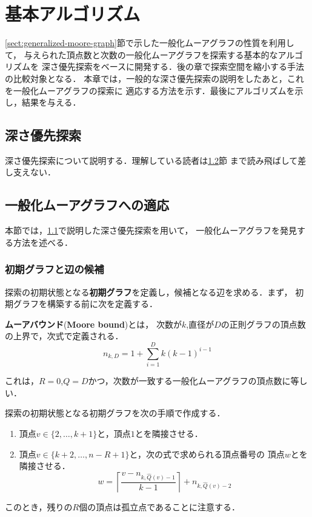
\chapter{基本アルゴリズム}
\label{chap:basic-algorithm}
\ref{sect:generalized-moore-graph}節で示した一般化ムーアグラフの性質を利用して，
与えられた頂点数と次数の一般化ムーアグラフを探索する基本的なアルゴリズムを
深さ優先探索をベースに開発する．後の章で探索空間を縮小する手法の比較対象となる．
本章では，一般的な深さ優先探索の説明をしたあと，これを一般化ムーアグラフの探索に
適応する方法を示す．最後にアルゴリズムを示し，結果を与える．

\section{深さ優先探索}
\label{sect:depth-first-search}
深さ優先探索について説明する．理解している読者は\ref{sect:apply-to-gmg}節
まで読み飛ばして差し支えない．

\section{一般化ムーアグラフへの適応}
\label{sect:apply-to-gmg}
本節では，\ref{sect:depth-first-search}で説明した深さ優先探索を用いて，
一般化ムーアグラフを発見する方法を述べる．

\subsection{初期グラフと辺の候補}
\label{subsect:initial-graph}
探索の初期状態となる\textbf{初期グラフ}を定義し，候補となる辺を求める．まず，
初期グラフを構築する前に次を定義する．
\begin{definition}
  \textbf{ムーアバウンド}(\textbf{Moore bound})とは，
  次数が$k$,直径が$D$の正則グラフの頂点数の上界で，次式で定義される．
  \begin{equation}
    n_{k,D} = 1 + \sum_{i=1}^Dk(k-1)^{i-1}
  \end{equation}
\end{definition}
これは，$R=0$,$Q=D$かつ，次数が一致する一般化ムーアグラフの頂点数に等しい．

探索の初期状態となる初期グラフを次の手順で作成する．
\begin{enumerate}
\item 頂点$v\in\{2,\ldots,k+1\}$と，頂点$1$とを隣接させる．
\item 頂点$v\in\{k+2,\ldots,n-R+1\}$と，次の式で求められる頂点番号の
  頂点$w$とを隣接させる．
  \[ w=\left\lceil\frac{v-n_{k,\hat{Q}(v)-1}}{k-1}\right\rceil
  +n_{k,\hat{Q}(v)-2}\]
\end{enumerate}
このとき，残りの$R$個の頂点は孤立点であることに注意する．

